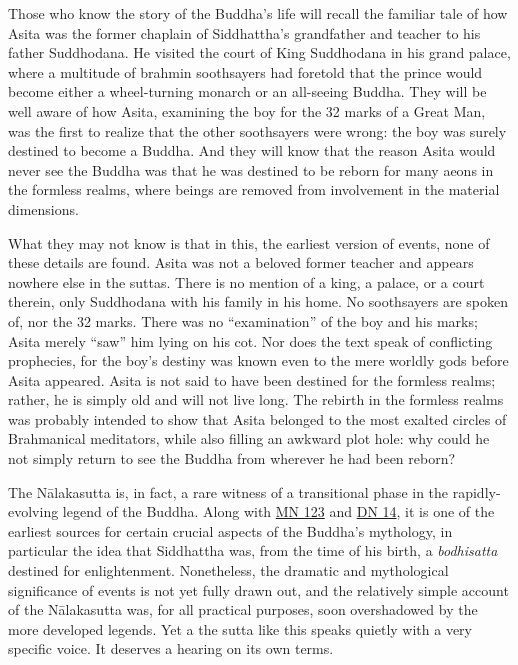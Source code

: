 \documentclass[12pt,openany]{book}%
\begin{document}
Those who know the story of the Buddha’s life will recall the familiar tale of how Asita was the former chaplain of Siddhattha’s grandfather and teacher to his father Suddhodana. He visited the court of King Suddhodana in his grand palace, where a multitude of brahmin soothsayers had foretold that the prince would become either a wheel-turning monarch or an all-seeing Buddha. They will be well aware of how Asita, examining the boy for the 32 marks of a Great Man, was the first to realize that the other soothsayers were wrong: the boy was surely destined to become a Buddha. And they will know that the reason Asita would never see the Buddha was that he was destined to be reborn for many aeons in the formless realms, where beings are removed from involvement in the material dimensions.

What they may not know is that in this, the earliest version of events, none of these details are found. Asita was not a beloved former teacher and appears nowhere else in the suttas. There is no mention of a king, a palace, or a court therein, only Suddhodana with his family in his home. No soothsayers are spoken of, nor the 32 marks. There was no “examination” of the boy and his marks; Asita merely “saw” him lying on his cot. Nor does the text speak of conflicting prophecies, for the boy’s destiny was known even to the mere worldly gods before Asita appeared. Asita is not said to have been destined for the formless realms; rather, he is simply old and will not live long. The rebirth in the formless realms was probably intended to show that Asita belonged to the most exalted circles of Brahmanical meditators, while also filling an awkward plot hole: why could he not simply return to see the Buddha from wherever he had been reborn?

The \textsanskrit{Nālakasutta} is, in fact, a rare witness of a transitional phase in the rapidly-evolving legend of the Buddha. Along with \href{https://suttacentral.net/mn123/en/sujato}{MN 123} and \href{https://suttacentral.net/dn14/en/sujato}{DN 14}, it is one of the earliest sources for certain crucial aspects of the Buddha’s mythology, in particular the idea that Siddhattha was, from the time of his birth, a \textit{bodhisatta} destined for enlightenment. Nonetheless, the dramatic and mythological significance of events is not yet fully drawn out, and the relatively simple account of the \textsanskrit{Nālakasutta} was, for all practical purposes, soon overshadowed by the more developed legends. Yet a the sutta like this speaks quietly with a very specific voice. It deserves a hearing on its own terms.
\end{document}
